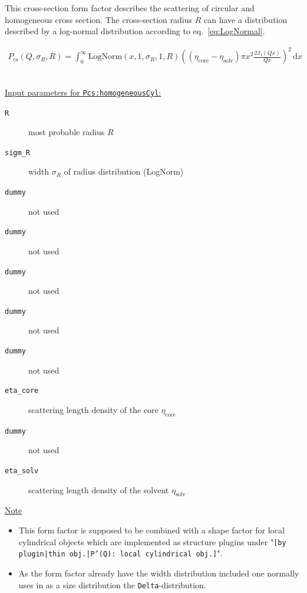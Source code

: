 This cross-section form factor describes the scattering of circular and homogeneous cross section.
The cross-section radius $R$ can have a distribution described by a log-normal distribution according
to eq.\ \ref{eq:LogNormal}.

\begin{align}
P_\text{cs}(Q,\sigma_{R},R) = \int_0^\infty \textrm{LogNorm}(x,1,\sigma_{R},1,R) \left( \left(\eta_\textrm{core}-\eta_\textrm{solv}\right) \pi x^2 \frac{2 \mathrm{J}_1(Qx)}{Qx} \right)^2 \, \textrm{d}x
\end{align}

\vspace{5mm}

\hspace{1pt}\\
\uline{Input parameters for \texttt{Pcs:homogeneousCyl}:}
\begin{description}
    \item[\texttt{R}] most probable radius $R$
    \item[\texttt{sigm\_R}] width $\sigma_R$ of radius distribution (LogNorm)
    \item[\texttt{dummy}] not used
    \item[\texttt{dummy}] not used
    \item[\texttt{dummy}] not used
    \item[\texttt{dummy}] not used
    \item[\texttt{dummy}] not used
    \item[\texttt{eta\_core}] scattering length density of the core $\eta_\textrm{core}$
    \item[\texttt{dummy}] not used
    \item[\texttt{eta\_solv}] scattering length density of the solvent $\eta_\textrm{solv}$
\end{description}

\noindent
\uline{Note}
\begin{itemize}
  \item This form factor is supposed to be combined with a shape factor for
local cylindrical objects which are implemented as structure  plugins
under "\texttt{[by plugin|thin obj.|P'(Q): local cylindrical obj.]}".
\item As the form factor already have the width distribution included one normally uses in \SASfit as a size distribution
the \texttt{Delta}-distribution.
\end{itemize}

